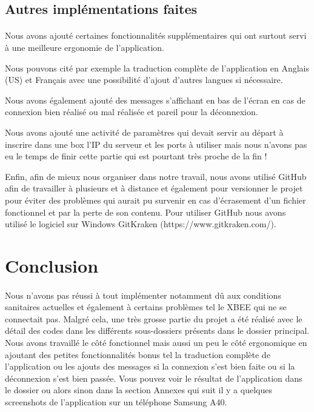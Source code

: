\documentclass[a4paper,12pt]{report}
\begin{document}
		
		\subsection{Autres implémentations faites}
			\paragraph*{}
			Nous avons ajouté certaines fonctionnalités supplémentaires qui ont surtout servi à une meilleure ergonomie de l'application.
			
			Nous pouvons cité par exemple la traduction complète de l'application en Anglais (US) et Français avec une possibilité d'ajout d'autres langues si nécessaire.
			
			Nous avons également ajouté des messages s'affichant en bas de l'écran en cas de connexion bien réalisé ou mal réalisée et pareil pour la déconnexion.
			
			Nous avons ajouté une activité de paramètres qui devait servir au départ à inscrire dans une box l'IP du serveur et les ports à utiliser mais nous n'avons pas eu le temps de finir cette partie qui est pourtant très proche de la fin !
			
			Enfin, afin de mieux nous organiser dans notre travail, nous avons utilisé GitHub afin de travailler à plusieurs et à distance et également pour versionner le projet pour éviter des problèmes qui aurait pu survenir en cas d'écrasement d'un fichier fonctionnel et par la perte de son contenu. Pour utiliser GitHub nous avons utilisé le logiciel sur Windows GitKraken (https://www.gitkraken.com/).
	
	\section{Conclusion}
		\paragraph*{}
		Nous n'avons pas réussi à tout implémenter notamment dû aux conditions sanitaires actuelles et également à certains problèmes tel le XBEE qui ne se connectait pas. Malgré cela, une très grosse partie du projet a été réalisé avec le détail des codes dans les différents sous-dossiers présents dans le dossier principal. Nous avons travaillé le côté fonctionnel mais aussi un peu le côté ergonomique en ajoutant des petites fonctionnalités bonus tel la traduction complète de l'application ou les ajouts des messages si la connexion s'est bien faite ou si la déconnexion s'est bien passée. Vous pouvez voir le résultat de l'application dans le dossier ou alors sinon dans la section Annexes qui suit il y a quelques screenshots de l'application sur un téléphone Samsung A40.
	
\end{document}
